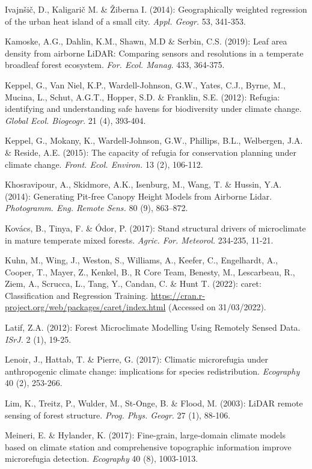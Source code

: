 \documentclass[5p]{elsarticle} %
\newlength{\cslhangindent}
\newlength{\cslentryspacingunit} %
\newenvironment{CSLReferences}[2] %
 {%
  \setlength{\parindent}{0pt}
  \ifodd #1
  \let\oldpar\par
  \def\par{\hangindent=\cslhangindent\oldpar}
  \fi
  \setlength{\parskip}{#2\cslentryspacingunit}
 }%
 {}
\begin{document}
\begin{CSLReferences}{1}{0}
Ivajnšič, D., Kaligarič M. \& Žiberna I. (2014): Geographically weighted regression of the urban heat island of a small city. \emph{Appl. Geogr.} 53, 341-353. 

Kamoske, A.G., Dahlin, K.M., Shawn, M.D \& Serbin, C.S. (2019): Leaf area density from airborne LiDAR: Comparing sensors and resolutions in a temperate broadleaf forest ecosystem. \emph{For. Ecol. Manag.} 433, 364-375.

Keppel, G., Van Niel, K.P., Wardell-Johnson, G.W., Yates, C.J., Byrne, M., Mucina, L., Schut, A.G.T., Hopper, S.D. \& Franklin, S.E. (2012): Refugia: identifying and understanding safe havens for biodiversity under climate change. \emph{Global Ecol. Biogeogr.} 21 (4), 393-404.

Keppel, G., Mokany, K., Wardell-Johnson, G.W., Phillips, B.L., Welbergen, J.A. \& Reside, A.E. (2015): The capacity of refugia for conservation planning under climate change. \emph{Front. Ecol. Environ.} 13 (2), 106-112.

Khosravipour, A., Skidmore, A.K., Isenburg, M., Wang, T. \& Hussin, Y.A. (2014): Generating Pit-free Canopy Height Models from Airborne Lidar. \emph{Photogramm. Eng. Remote Sens.} 80 (9), 863–872.

Kovács, B., Tinya, F. \& Ódor, P. (2017): Stand structural drivers of microclimate in mature temperate mixed forests. \emph{Agric. For. Meteorol.} 234-235, 11-21.

Kuhn, M., Wing, J., Weston, S., Williams, A., Keefer, C., Engelhardt, A., Cooper, T., Mayer, Z., Kenkel, B., R Core Team, Benesty, M., Lescarbeau, R., Ziem, A., Scrucca, L., Tang, Y., Candan, C. \& Hunt T. (2022):  caret: Classification and Regression Training. \url{https://cran.r-project.org/web/packages/caret/index.html} (Accessed on 31/03/2022).
 
Latif, Z.A. (2012): Forest Microclimate Modelling Using Remotely Sensed Data. \emph{ISrJ.} 2 (1), 19-25.

Lenoir, J., Hattab, T. \& Pierre, G. (2017): Climatic microrefugia under anthropogenic climate change: implications for species redistribution. \emph{Ecography} 40 (2), 253-266.

Lim, K., Treitz, P., Wulder, M., St-Onge, B. \& Flood, M. (2003): LiDAR remote sensing of forest structure. \emph{Prog. Phys. Geogr.} 27 (1), 88-106.

Meineri, E. \& Hylander, K. (2017): Fine-grain, large-domain climate models based on climate station and comprehensive topographic information improve microrefugia detection. \emph{Ecography} 40 (8), 1003-1013.


\end{CSLReferences}
\end{document}
